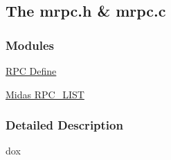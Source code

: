 \subsection{The mrpc.h \& mrpc.c}
\label{group__mrpcincludecode}
\subsubsection*{Modules}
\begin{DoxyCompactItemize}
\item 
\hyperlink{group__mrpcdefineh}{RPC Define}
\item 
\hyperlink{group__mrpcstructc}{Midas RPC\_\-LIST}
\end{DoxyCompactItemize}


\subsubsection{Detailed Description}
dox 